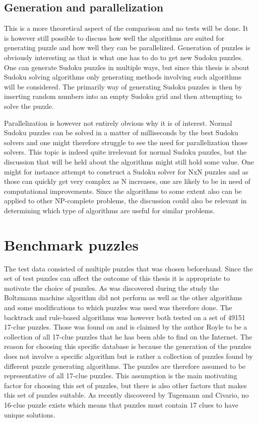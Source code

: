 \documentclass[a4paper,11pt]{kth-mag}
\begin{document}
\FloatBarrier
\subsection{Generation and parallelization}
This is a more theoretical aspect of the comparison and no tests will be done.
It is however still possible to discuss how well the algorithms are suited for generating puzzle and how well they can be parallelized. 
Generation of puzzles is obviously interesting as that is what one has to do to get new Sudoku puzzles.
One can generate Sudoku puzzles in multiple ways, but since this thesis is about Sudoku solving algorithms only generating methods involving such algorithms will be considered.
The primarily way of generating Sudoku puzzles is then by inserting random numbers into an empty Sudoku grid and then attempting to solve the puzzle.

Parallelization is however not entirely obvious why it is of interest. 
Normal Sudoku puzzles can be solved in a matter of milliseconds by the best Sudoku solvers and one might therefore struggle to see the need for parallelization those solvers. 
This topic is indeed quite irrelevant for normal Sudoku puzzles, but the discussion that will be held about the algorithms might still hold some value.
One might for instance attempt to construct a Sudoku solver for NxN puzzles and as those can quickly get very complex as N increases, one are likely to be in need of computational improvements.  
Since the algorithms to some extent also can be applied to other NP-complete problems, the discussion could also be relevant in determining which type of algorithms are useful for similar problems. 

\FloatBarrier
\section{Benchmark puzzles}
\label{sec:benchmarkPuzzles}
The test data consisted of multiple puzzles that was chosen beforehand.
Since the set of test puzzles can affect the outcome of this thesis it is appropriate to motivate the choice of puzzles.
As was discovered during the study the Boltzmann machine algorithm did not perform as well as the other algorithms and some modifications to which puzzles was used was therefore done.
The backtrack and rule-based algorithms was however both tested on a set of 49151 17-clue puzzles. 
Those was found on \cite{database} and is claimed by the author Royle to be a collection of all 17-clue puzzles that he has been able to find on the Internet. 
The reason for choosing this specific database is because the generation of the puzzles does not involve a specific algorithm but is rather a collection of puzzles found by different puzzle generating algorithms.  
The puzzles are therefore assumed to be representative of all 17-clue puzzles. 
This assumption is the main motivating factor for choosing this set of puzzles, but there is also other factors that makes this set of puzzles suitable. 
As recently discovered by Tugemann and Civario, no 16-clue puzzle exists which means that puzzles must contain 17 clues to have unique solutions.\cite{17clueProof}  
\end{document}
